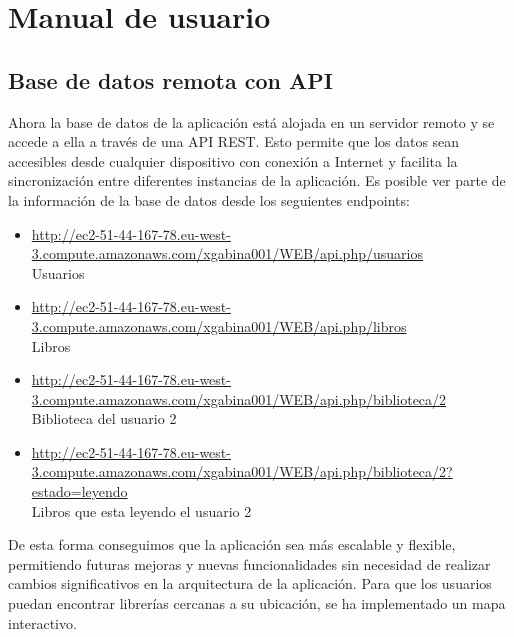 \documentclass[a4paper,11pt]{report}
\begin{document}
  \chapter{Manual de usuario}
    \section{Base de datos remota con API}
      Ahora la base de datos de la aplicación está alojada en un servidor remoto y se accede a ella a través de una API REST. Esto permite que los datos sean accesibles desde cualquier dispositivo con conexión a Internet y facilita la sincronización entre diferentes instancias de la aplicación.
      Es posible ver parte de la información de la base de datos desde los seguientes endpoints:
      \begin{itemize}
        \item \href{http://ec2-51-44-167-78.eu-west-3.compute.amazonaws.com/xgabina001/WEB/api.php/usuarios}{http://ec2-51-44-167-78.eu-west-3.compute.amazonaws.com/xgabina001/WEB/api.php/usuarios} \\Usuarios
        \item \href{http://ec2-51-44-167-78.eu-west-3.compute.amazonaws.com/xgabina001/WEB/api.php/libros}{http://ec2-51-44-167-78.eu-west-3.compute.amazonaws.com/xgabina001/WEB/api.php/libros} \\Libros
        \item \href{http://ec2-51-44-167-78.eu-west-3.compute.amazonaws.com/xgabina001/WEB/api.php/biblioteca/2}{http://ec2-51-44-167-78.eu-west-3.compute.amazonaws.com/xgabina001/WEB/api.php/biblioteca/2} \\Biblioteca del usuario 2
        \item \href{http://ec2-51-44-167-78.eu-west-3.compute.amazonaws.com/xgabina001/WEB/api.php/biblioteca/1?estado=leyendo}{http://ec2-51-44-167-78.eu-west-3.compute.amazonaws.com/xgabina001/WEB/api.php/biblioteca/2?estado=leyendo} \\Libros que esta leyendo el usuario 2
      \end{itemize}
      De esta forma conseguimos que la aplicación sea más escalable y flexible, permitiendo futuras mejoras y nuevas funcionalidades sin necesidad de realizar cambios significativos en la arquitectura de la aplicación.
      Para que los usuarios puedan encontrar librerías cercanas a su ubicación, se ha implementado un mapa interactivo.
\end{document}

